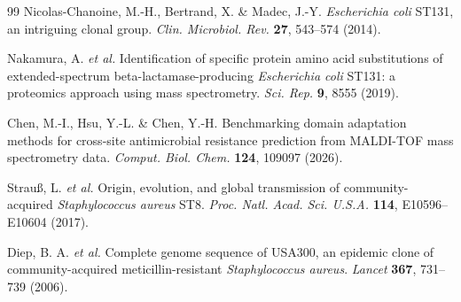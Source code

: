 \documentclass[11pt]{article}
\begin{document}
\begin{thebibliography}{99}
Nicolas-Chanoine, M.-H., Bertrand, X. \& Madec, J.-Y. \textit{Escherichia coli} ST131, an intriguing clonal group. \textit{Clin. Microbiol. Rev.} \textbf{27}, 543--574 (2014).

Nakamura, A. \textit{et al.} Identification of specific protein amino acid substitutions of extended-spectrum beta-lactamase-producing \textit{Escherichia coli} ST131: a proteomics approach using mass spectrometry. \textit{Sci. Rep.} \textbf{9}, 8555 (2019).

Chen, M.-I., Hsu, Y.-L. \& Chen, Y.-H. Benchmarking domain adaptation methods for cross-site antimicrobial resistance prediction from MALDI-TOF mass spectrometry data. \textit{Comput. Biol. Chem.} \textbf{124}, 109097 (2026).

Strau{\ss}, L. \textit{et al.} Origin, evolution, and global transmission of community-acquired \textit{Staphylococcus aureus} ST8. \textit{Proc. Natl. Acad. Sci. U.S.A.} \textbf{114}, E10596--E10604 (2017).

Diep, B. A. \textit{et al.} Complete genome sequence of USA300, an epidemic clone of community-acquired meticillin-resistant \textit{Staphylococcus aureus}. \textit{Lancet} \textbf{367}, 731--739 (2006).

\end{thebibliography}
\end{document}
